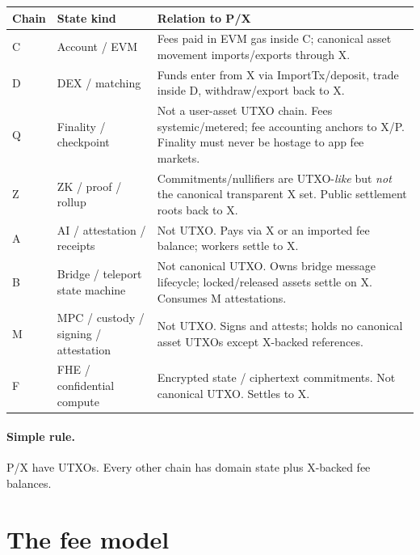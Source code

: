 \documentclass[11pt,letterpaper]{article}
\newcommand{\chain}[1]{\textsf{#1}}
\begin{document}
\begin{longtable}{@{}p{1.6cm}p{4.2cm}p{7.2cm}@{}}
\toprule
\textbf{Chain} & \textbf{State kind} & \textbf{Relation to \chain{P}/\chain{X}} \\
\midrule
\endhead
\chain{C} & Account / EVM & Fees paid in EVM gas inside \chain{C}; canonical asset movement imports/exports through \chain{X}. \\
\chain{D} & DEX / matching & Funds enter from \chain{X} via ImportTx/deposit, trade inside \chain{D}, withdraw/export back to \chain{X}. \\
\chain{Q} & Finality / checkpoint & Not a user-asset UTXO chain. Fees systemic/metered; fee accounting anchors to \chain{X}/\chain{P}. Finality must never be hostage to app fee markets. \\
\chain{Z} & ZK / proof / rollup & Commitments/nullifiers are UTXO-\emph{like} but \emph{not} the canonical transparent \chain{X} set. Public settlement roots back to \chain{X}. \\
\chain{A} & AI / attestation / receipts & Not UTXO. Pays via \chain{X} or an imported fee balance; workers settle to \chain{X}. \\
\chain{B} & Bridge / teleport state machine & Not canonical UTXO. Owns bridge message lifecycle; locked/released assets settle on \chain{X}. Consumes \chain{M} attestations. \\
\chain{M} & MPC / custody / signing / attestation & Not UTXO. Signs and attests; holds no canonical asset UTXOs except \chain{X}-backed references. \\
\chain{F} & FHE / confidential compute & Encrypted state / ciphertext commitments. Not canonical UTXO. Settles to \chain{X}. \\
\bottomrule
\end{longtable}

\paragraph{Simple rule.} \chain{P}/\chain{X} have UTXOs. Every other chain has
domain state plus \chain{X}-backed fee balances.

\section{The fee model}
\end{document}
